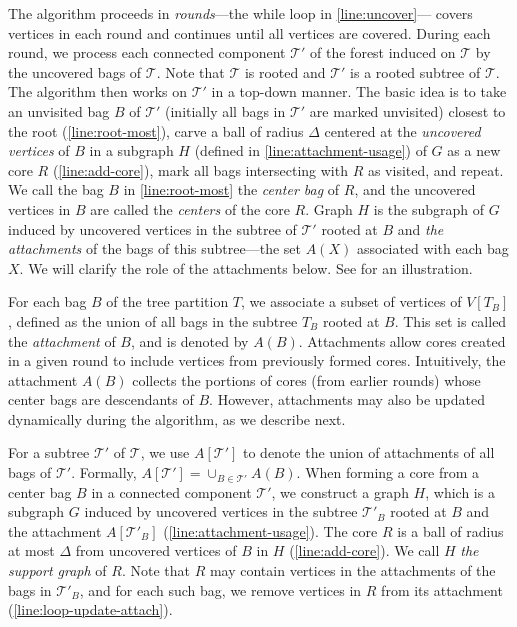 \documentclass{theoretics}
\newcommand{\mt}{\mathcal{T}}
\begin{document}
The algorithm proceeds in \emph{rounds}---the while loop in \cref{line:uncover}--- covers vertices in each round and continues until all vertices are covered. During each round, we process each connected component $\mt'$ of the forest induced on $\mathcal{T}$ by the uncovered bags of $\mathcal{T}$. Note that $\mt$ is rooted and  $\mt'$ is a rooted subtree of $\mathcal{T}$. The algorithm then works on $\mt'$ in a top-down manner. The basic idea is to take an unvisited bag $B$ of $\mathcal{T}'$ (initially all bags in $\mt'$ are marked unvisited) closest to the root (\cref{line:root-most}), carve a ball of radius $\Delta$ centered at the \emph{uncovered vertices} of $B$ in a subgraph $H$ (defined in \cref{line:attachment-usage}) of $G$ as a new core $R$ (\cref{line:add-core}), mark all bags intersecting with $R$ as visited, and repeat.  We call the bag $B$ in \cref{line:root-most} the \emph{center bag} of $R$, and the uncovered vertices in $B$ are called the \emph{centers} of the core $R$. Graph $H$ is the subgraph of $G$ induced by uncovered vertices in the subtree of $\mt'$ rooted at $B$ and \emph{the attachments} of the bags of this subtree---the set $A(X)$ associated with each bag $X$. We will clarify the role of the attachments below. See  for an illustration. 

For each bag $B$ of the tree partition $T$, we associate a subset of vertices of $V[T_B]$, defined as the union of all bags in the subtree $T_B$ rooted at $B$. This set is called the \emph{attachment} of $B$, and is denoted by $A(B)$. Attachments allow cores created in a given round to include vertices from previously formed cores. Intuitively, the attachment $A(B)$ collects the portions of cores (from earlier rounds) whose center bags are descendants of $B$. However, attachments may also be updated dynamically during the algorithm, as we describe next.

For a subtree $\mt'$ of $\mathcal{T}$, we use $A[\mt']$ to denote the union of attachments of all bags of $\mt'$. Formally, $A[\mt'] = \cup_{B\in \mt'}A(B)$. When forming a core from a center bag $B$ in a connected component $\mt'$,  we construct a graph $H$, which is a subgraph $G$ induced by uncovered vertices in the subtree $\mt'_B$ rooted at $B$ and the attachment $A[\mt'_B]$ (\cref{line:attachment-usage}).  The core $R$ is a ball of radius at most $\Delta$ from uncovered vertices of $B$ in $H$ (\cref{line:add-core}).  We call $H$ \emph{the support graph} of $R$. Note that $R$ may contain vertices in the attachments of the bags in $\mt'_B$, and for each such bag, we remove vertices in $R$ from its attachment (\cref{line:loop-update-attach}). 
\end{document}
